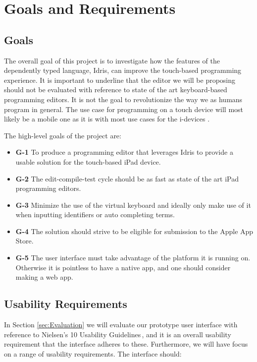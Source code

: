 \section{Goals and Requirements}
\label{sec:GoalsAndRequirements}

\subsection{Goals} The overall goal of this project is to investigate how the
features of the dependently typed language, Idris, can improve the touch-based
programming experience. It is important to underline that the editor we will be
proposing should not be evaluated with reference to state of the art keyboard-based programming editors. It is not the goal to revolutionize the way we as
humans program in general. The use case for programming on a touch device will most likely be a
mobile one as it is with most use cases for the i-devices \cite[p. 26]{nielsen2013mobile}.

The high-level goals of the project are:

\begin{itemize} 
	\item \textbf{G-1} To produce a programming editor that leverages
	Idris to provide a usable solution for the touch-based iPad device.
	\item \textbf{G-2} The edit-compile-test cycle should be as fast as state of the art iPad 
	programming editors.
	\item \textbf{G-3} Minimize the use of the virtual keyboard\cite[pp. 76]{nielsen2013mobile} and
	ideally only make use of it when inputting identifiers or auto completing terms.
	\item \textbf{G-4} The solution should strive to be eligible for submission to the Apple App Store.
	\item \textbf{G-5} The user interface must take advantage of the platform it is running on. 
	Otherwise it is pointless to have a native app, and one should consider making a web app.
\end{itemize}

\subsection{Usability Requirements} 
In Section \ref{sec:Evaluation} we will evaluate our prototype user interface with reference to Nielsen's 10 Usability
Guidelines\,\cite{nielsen1990heuristic}, and it is an overall usability
requirement that the interface adheres to these. Furthermore, we will have focus on a range of
usability requirements. The interface should:

